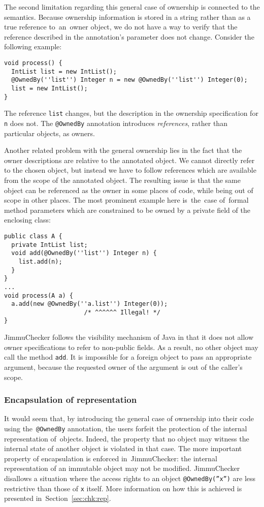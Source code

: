 \documentclass{pracamgr}
\theoremstyle{break}
\theoremstyle{break}
\theoremstyle{break}
\begin{document}
The second limitation regarding this general case of ownership is
connected to the semantics. Because ownership information is stored in
a string rather than as a true reference to~an~owner object, we do not
have a way to verify that the reference described in the annotation's
parameter does not change. Consider the following example:
\begin{lstlisting}
void process() {
  IntList list = new IntList();
  @OwnedBy(''list'') Integer n = new @OwnedBy(''list'') Integer(0);
  list = new IntList();
}
\end{lstlisting}
The reference \texttt{list} changes, but the description in the
ownership specification for \texttt{n} does not. The \texttt{@OwnedBy}
annotation introduces \emph{references}, rather than particular
objects, as owners.

Another related problem with the general ownership lies in the fact
that the owner descriptions are relative to the annotated object. We
cannot directly refer to the chosen object, but instead we have to
follow references which are available from the scope of the annotated
object. The resulting issue is that the same object can be referenced
as the owner in some places of code, while being out of scope in other
places. The most prominent example here is~the~case of~formal method
parameters which are constrained to be owned by a private field of the
enclosing class:
\begin{lstlisting}
public class A {
  private IntList list;
  void add(@OwnedBy(''list'') Integer n) {
    list.add(n);
  }
}
...
void process(A a) {
  a.add(new @OwnedBy(''a.list'') Integer(0)); 
                      /* ^^^^^^ Illegal! */
}
\end{lstlisting}
JimmuChecker follows the visibility mechanism of Java in that it does
not allow owner spe\-ci\-fi\-ca\-tions to refer to non-public fields.
As a result, no other object may call the method \texttt{add}. It is
impossible for a foreign object to pass an appropriate argument,
because the requested owner of the argument is out of the caller's
scope.

\subsubsection{Encapsulation of representation}

It would seem that, by introducing the general case of ownership into
their code using the~\texttt{@OwnedBy} annotation, the users forfeit
the protection of the internal representation of~objects. Indeed, the
property that no object may witness the internal state of another
object is violated in that case. The more important property of
encapsulation is enforced in~JimmuChecker: the internal
representation of an immutable object may not be
modified. JimmuChecker disallows a situation where the access rights
to an object \texttt{@OwnedBy(''x'')} are less restrictive than those
of \texttt{x} itself. More information on how this is achieved is
presented in~Section~\ref{sec:chk:rep}.
\end{document}

